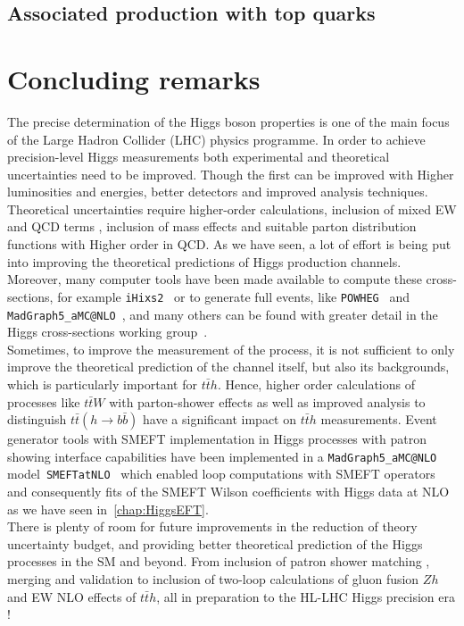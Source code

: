 \subsection{Associated production with top quarks}



\section{Concluding remarks \label{sec:singlehiggsconc}  }
The precise determination of the Higgs boson properties is one of the main focus of the Large Hadron Collider (LHC) physics programme. In order to achieve precision-level Higgs measurements both experimental and theoretical uncertainties need to be improved. Though the first can be improved with Higher luminosities and energies, better detectors and improved analysis techniques. Theoretical uncertainties require higher-order calculations, inclusion of mixed EW and QCD terms , inclusion of mass effects and suitable parton distribution functions with Higher order in QCD.  As we have seen, a lot of effort is being put into improving the theoretical predictions of Higgs production channels. Moreover, many computer tools have been made available to compute these cross-sections, for example  \texttt{iHixs2}~\cite{Dulat:2018rbf} or to generate full events, like \texttt{POWHEG}~\cite{Alioli:2008tz,Nason:2009ai,Bagnaschi:2011tu,Campbell:2012am,Luisoni:2013cuh,Jager:2014vna,Hartanto:2015uka} and \texttt{MadGraph5\_aMC@NLO}~\cite{Alwall:2014hca}, and many others can be found with greater detail in the Higgs cross-sections working group~\cite{HXSWG}.  \\ Sometimes, to improve the measurement of the process, it is not sufficient to only improve the theoretical prediction of the channel itself, but also its backgrounds, which is particularly important for $t\bar th $. Hence, higher order calculations of processes like $t\bar t W$ with parton-shower effects as well as improved analysis to distinguish $t\bar t(h \to b \bar b) $ have a significant impact on  $t\bar th $ measurements.
Event generator tools with SMEFT implementation in Higgs processes with patron showing interface capabilities  have been implemented in a \texttt{MadGraph5\_aMC@NLO} model~\texttt{SMEFTatNLO}~\cite{Degrande:2020evl} which enabled loop computations with SMEFT operators and consequently fits of the SMEFT Wilson coefficients with Higgs data at NLO as we have seen in~\autoref{chap:HiggsEFT}.\\
There is plenty of room for future improvements in the reduction of theory uncertainty budget, and providing better theoretical prediction of the Higgs processes in the SM and beyond. From inclusion of patron shower matching , merging and validation to  inclusion of two-loop calculations of gluon fusion $Zh$  and EW NLO effects of  $t\bar th $, all in preparation to the HL-LHC Higgs precision era ! 

